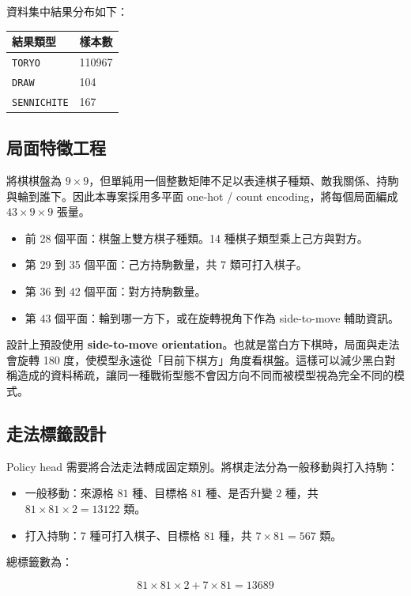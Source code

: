 \documentclass[12pt,a4paper,fontset=none]{ctexart}
\begin{document}
資料集中結果分布如下：

\begin{longtable}{p{}p{}}
\toprule
\textbf{結果類型} & \textbf{樣本數}\\
\midrule
\endhead
\texttt{TORYO} & 110967\\
\texttt{DRAW} & 104\\
\texttt{SENNICHITE} & 167\\
\bottomrule
\end{longtable}

\subsection{局面特徵工程}
將棋棋盤為 $9 \times 9$，但單純用一個整數矩陣不足以表達棋子種類、敵我關係、持駒與輪到誰下。因此本專案採用多平面 one-hot / count encoding，將每個局面編成 $43 \times 9 \times 9$ 張量。

\begin{itemize}
  \item 前 28 個平面：棋盤上雙方棋子種類。14 種棋子類型乘上己方與對方。
  \item 第 29 到 35 個平面：己方持駒數量，共 7 類可打入棋子。
  \item 第 36 到 42 個平面：對方持駒數量。
  \item 第 43 個平面：輪到哪一方下，或在旋轉視角下作為 side-to-move 輔助資訊。
\end{itemize}

設計上預設使用 \textbf{side-to-move orientation}。也就是當白方下棋時，局面與走法會旋轉 180 度，使模型永遠從「目前下棋方」角度看棋盤。這樣可以減少黑白對稱造成的資料稀疏，讓同一種戰術型態不會因方向不同而被模型視為完全不同的模式。

\subsection{走法標籤設計}
Policy head 需要將合法走法轉成固定類別。將棋走法分為一般移動與打入持駒：

\begin{itemize}
  \item 一般移動：來源格 $81$ 種、目標格 $81$ 種、是否升變 $2$ 種，共 $81 \times 81 \times 2 = 13122$ 類。
  \item 打入持駒：7 種可打入棋子、目標格 $81$ 種，共 $7 \times 81 = 567$ 類。
\end{itemize}

總標籤數為：

\[
81 \times 81 \times 2 + 7 \times 81 = 13689
\]
\end{document}
